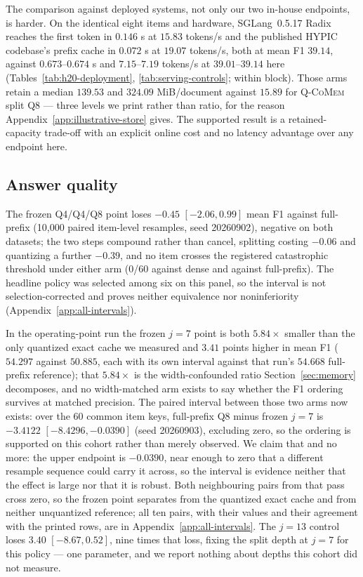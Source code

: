 \documentclass{article}
\newcommand{\qcomem}{\textsc{Q-CoMem}}
\begin{document}
The comparison against deployed systems, not only our two in-house endpoints, is
harder.  On the identical eight items and hardware, SGLang~0.5.17 Radix reaches
the first token in $0.146$ s at $15.83$ tokens/s and the published HYPIC
codebase's prefix cache in $0.072$ s at $19.07$ tokens/s, both at mean F1
$39.14$, against $0.673$--$0.674$ s and $7.15$--$7.19$ tokens/s at
$39.01$--$39.14$ here (Tables~\ref{tab:h20-deployment},
\ref{tab:serving-controls}; within block).  Those arms retain a median $139.53$
and $324.09$ MiB/document against $15.89$ for \qcomem{} split Q8 --- three levels
we print rather than ratio, for the reason
Appendix~\ref{app:illustrative-store} gives.  The supported result is a
retained-capacity trade-off with an explicit online cost and no latency
advantage over any endpoint here.


\subsection{Answer quality}
\label{sec:quality}

The frozen Q4/Q4/Q8 point loses $-0.45$ $[-2.06,0.99]$ mean F1 against
full-prefix (10,000 paired item-level resamples, seed 20260902), negative on both
datasets; the two steps compound rather than cancel, splitting costing $-0.06$
and quantizing a further $-0.39$, and no item crosses the registered
catastrophic threshold under either arm (0/60 against dense and against
full-prefix).  The headline policy was selected among
six on this panel, so the interval is not selection-corrected and proves neither
equivalence nor noninferiority (Appendix~\ref{app:all-intervals}).

In the operating-point run the frozen $j=7$ point is both $5.84\times$ smaller
than the only quantized exact cache we measured and $3.41$ points higher in mean
F1 ($54.297$ against $50.885$, each with its own interval against that run's
$54.668$ full-prefix reference); that $5.84\times$ is the width-confounded ratio
Section~\ref{sec:memory} decomposes, and no width-matched arm exists to say
whether the F1 ordering survives at matched precision.  The paired interval
between those two arms now exists: over the 60 common item keys, full-prefix Q8
minus frozen $j=7$ is $-3.4122$ $[-8.4296,-0.0390]$ (seed 20260903), excluding
zero, so the ordering is supported on this cohort rather than merely observed.
We claim that and no more: the upper endpoint is $-0.0390$, near enough to zero
that a different resample sequence could carry it across, so the interval is
evidence neither that the effect is large nor that it is robust.  Both
neighbouring pairs from that pass cross zero, so the frozen point separates from
the quantized exact cache and from neither unquantized reference; all ten pairs,
with their values and their agreement with the printed rows, are in
Appendix~\ref{app:all-intervals}.  The $j=13$ control loses $3.40$
$[-8.67,0.52]$, nine times that loss, fixing the split depth at $j=7$ for this
policy --- one parameter, and we report nothing about depths this cohort did
not measure.
\end{document}
